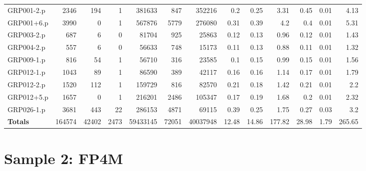 \begin{table}[H]
\begin{adjustwidth}{-0.4in}{-0.5in}
\begin{tabular}{| l || r | r | r || r | r | r || r | r | r | r | r | r |}
GRP001-2.p&2346&194&1&381633&847&352216&0.2&0.25&3.31&0.45&0.01&4.13\\
GRP001+6.p&3990&0&1&567876&5779&276080&0.31&0.39&4.2&0.4&0.01&5.31\\
GRP003-2.p&687&6&0&81704&925&25863&0.12&0.13&0.96&0.12&0.01&1.43\\
GRP004-2.p&557&6&0&56633&748&15173&0.11&0.13&0.88&0.11&0.01&1.32\\
GRP009-1.p&816&54&1&56710&316&23585&0.1&0.15&0.99&0.15&0.01&1.56\\
GRP012-1.p&1043&89&1&86590&389&42117&0.16&0.16&1.14&0.17&0.01&1.79\\
GRP012-2.p&1520&112&1&159729&816&82570&0.21&0.18&1.42&0.21&0.01&2.2\\
GRP012+5.p&1657&0&1&216201&2486&105347&0.17&0.19&1.68&0.2&0.01&2.32\\
GRP026-1.p&3681&443&22&286153&4871&69115&0.39&0.25&1.75&0.27&0.03&3.2\\ \hline \hline
\textbf{Totals}&164574&42402&2473&59433145&72051&40037948&12.48&14.86&177.82&28.98&1.79&265.65\\ \hline
\end{tabular}\end{adjustwidth}\end{table}

\section{Sample 2: FP4M}

